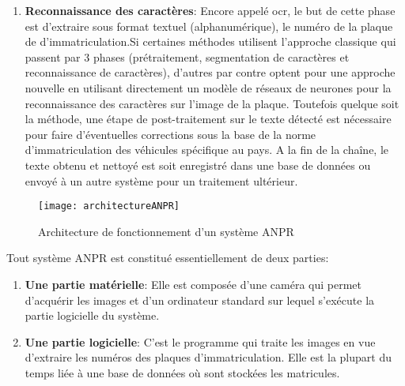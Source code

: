\begin{enumerate}
\begin{itemize}
        \end{itemize}
    \item \textbf{Reconnaissance des caractères}: Encore appelé \acrshort{ocr}, le but de cette phase est d’extraire sous format textuel (alphanumérique), le numéro de la plaque de d’immatriculation.Si certaines méthodes \cite{krimMaster, 10.1155/2018/6737314} utilisent l'approche classique qui passent par 3 phases (prétraitement, segmentation de caractères et reconnaissance de caractères), d’autres \cite{Alahyane2021OpenDF, doi:10.1177/0361198120954202} par contre optent pour une approche nouvelle en utilisant directement un modèle de réseaux de neurones pour la reconnaissance des caractères sur l'image de la plaque. Toutefois quelque soit la méthode, une étape de post-traitement sur le texte détecté est nécessaire pour faire d'éventuelles corrections sous la base de la norme d’immatriculation des véhicules spécifique au pays. A la fin de la chaîne, le texte obtenu et nettoyé est soit enregistré dans une base de données ou envoyé à un autre système pour un traitement ultérieur.

\end{enumerate}

\begin{figure}[H]
    \centering
    \texttt{[image: architectureANPR]}
    \caption{Architecture de fonctionnement d'un système ANPR}
\end{figure}
Tout système ANPR est constitué essentiellement de deux parties:
    \begin{enumerate}
        \item \textbf{Une partie matérielle}: Elle est composée d’une caméra qui permet d’acquérir les images et d’un ordinateur standard sur lequel s'exécute la partie logicielle du système.
        \item \textbf{Une partie logicielle}: C’est le programme qui traite les images en vue d’extraire les numéros des plaques d’immatriculation. Elle est la plupart du temps liée à une base de données où sont stockées les matricules.
    \end{enumerate}
